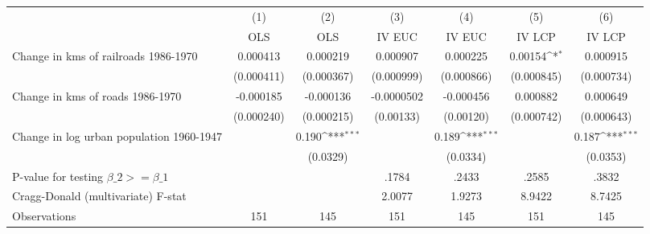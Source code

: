 {
\def\sym#1{\ifmmode^{#1}\else\(^{#1}\)\fi}
\begin{tabular}{l*{6}{c}}
\hline\hline
                &\multicolumn{1}{c}{(1)}&\multicolumn{1}{c}{(2)}&\multicolumn{1}{c}{(3)}&\multicolumn{1}{c}{(4)}&\multicolumn{1}{c}{(5)}&\multicolumn{1}{c}{(6)}\\
                &\multicolumn{1}{c}{OLS}&\multicolumn{1}{c}{OLS}&\multicolumn{1}{c}{IV EUC}&\multicolumn{1}{c}{IV EUC}&\multicolumn{1}{c}{IV LCP}&\multicolumn{1}{c}{IV LCP}\\
\hline
Change in kms of railroads 1986-1970& 0.000413         & 0.000219         & 0.000907         & 0.000225         &  0.00154\sym{*}  & 0.000915         \\
                &(0.000411)         &(0.000367)         &(0.000999)         &(0.000866)         &(0.000845)         &(0.000734)         \\
[1em]
Change in kms of roads 1986-1970&-0.000185         &-0.000136         &-0.0000502         &-0.000456         & 0.000882         & 0.000649         \\
                &(0.000240)         &(0.000215)         &(0.00133)         &(0.00120)         &(0.000742)         &(0.000643)         \\
[1em]
Change in log urban population 1960-1947&                  &    0.190\sym{***}&                  &    0.189\sym{***}&                  &    0.187\sym{***}\\
                &                  & (0.0329)         &                  & (0.0334)         &                  & (0.0353)         \\
\hline
P-value for testing $\beta\_{2} >= \beta\_{1}$&                  &                  &    .1784         &    .2433         &    .2585         &    .3832         \\
Cragg-Donald (multivariate) F-stat&                  &                  &   2.0077         &   1.9273         &   8.9422         &   8.7425         \\
Observations    &      151         &      145         &      151         &      145         &      151         &      145         \\
\hline\hline
\end{tabular}
}
